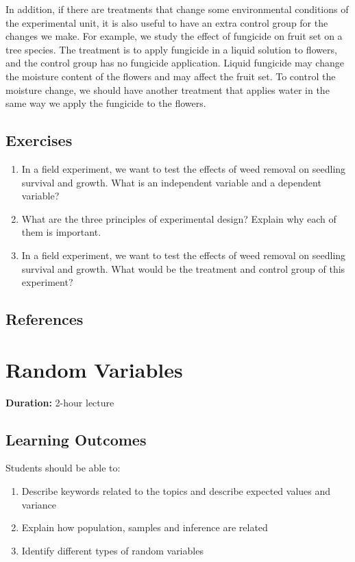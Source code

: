 \documentclass[
]{book}
\providecommand{\tightlist}{%
  \setlength{\itemsep}{0pt}\setlength{\parskip}{0pt}}
\begin{document}
In addition, if there are treatments that change some environmental conditions of the experimental unit, it is also useful to have an extra control group for the changes we make. For example, we study the effect of fungicide on fruit set on a tree species. The treatment is to apply fungicide in a liquid solution to flowers, and the control group has no fungicide application. Liquid fungicide may change the moisture content of the flowers and may affect the fruit set. To control the moisture change, we should have another treatment that applies water in the same way we apply the fungicide to the flowers.

\section{Exercises}\label{exercises-1}

\begin{enumerate}
\def\labelenumi{\arabic{enumi}.}
\item
  In a field experiment, we want to test the effects of weed removal on seedling survival and growth. What is an independent variable and a dependent variable?
\item
  What are the three principles of experimental design? Explain why each of them is important.
\item
  In a field experiment, we want to test the effects of weed removal on seedling survival and growth. What would be the treatment and control group of this experiment?
\end{enumerate}

\section{References}\label{references-1}

\chapter{Random Variables}\label{random-variables}

\textbf{Duration:} 2-hour lecture

\section{Learning Outcomes}\label{learning-outcomes-2}

Students should be able to:

\begin{enumerate}
\def\labelenumi{\arabic{enumi}.}
\tightlist
\item
  Describe keywords related to the topics and describe expected values and variance
\item
  Explain how population, samples and inference are related
\item
  Identify different types of random variables
\end{enumerate}
\end{document}
